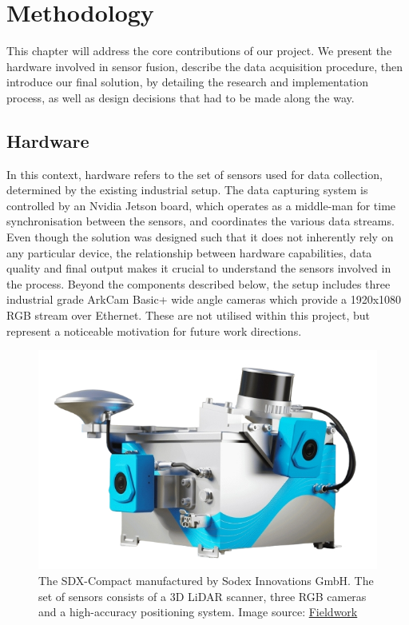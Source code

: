\chapter{Methodology}
\label{ch:methodology}

This chapter will address the core contributions of our project.
We present the hardware involved in sensor fusion, describe the data acquisition procedure, then introduce our final solution, by detailing the research and implementation process, as well as design decisions that had to be made along the way.

\section{Hardware}

In this context, hardware refers to the set of sensors used for data collection, determined by the existing industrial setup. The data capturing system is controlled by an Nvidia Jetson board, which operates as a middle-man for time synchronisation between the sensors, and coordinates the various data streams. Even though the solution was designed such that it does not inherently rely on any particular device, the relationship between hardware capabilities, data quality and final output makes it crucial to understand the sensors involved in the process. Beyond the components described below, the setup includes three industrial grade ArkCam Basic+ wide angle cameras which provide a 1920x1080 RGB stream over Ethernet. These are not utilised within this project, but represent a noticeable motivation for future work directions.

\begin{figure}
    \centering
    \includegraphics[width=0.6\linewidth]{images/sdx-compact-on-top-nobg.png}
    \caption[SDX-Compact]{The SDX-Compact manufactured by Sodex Innovations GmbH. The set of sensors consists of a 3D LiDAR scanner, three RGB cameras and a high-accuracy positioning system. Image source: \href{https://fieldwork.ch/de/produkte/geopositioning/mobile-datenerfassung/sdx-compact}{Fieldwork}}
    \label{fig:sdx-compact}
\end{figure}

